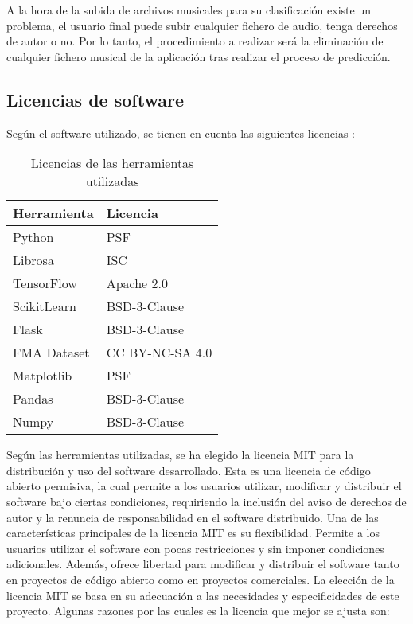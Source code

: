 A la hora de la subida de archivos musicales para su clasificación existe un problema, el usuario final puede subir cualquier fichero de audio, tenga derechos de autor o no. Por lo tanto, el procedimiento a realizar será la eliminación de cualquier fichero musical de la aplicación tras realizar el proceso de predicción.

\subsection{Licencias de software}

Según el software utilizado, se tienen en cuenta las siguientes licencias \cite{Creative_Commons, Open_Source_Initiative_2023}:

\begin{table}[h]
\centering
\caption{Licencias de las herramientas utilizadas}
\begin{tabular}{|l|l|}
\hline
\textbf{Herramienta} & \textbf{Licencia} \\
\hline
Python \cite{3.10_Documentation} & PSF \\
Librosa \cite{librosa} & ISC \\
TensorFlow \cite{TensorFlow} & Apache 2.0 \\
ScikitLearn \cite{scikit} & BSD-3-Clause \\
Flask \cite{Flask} & BSD-3-Clause \\
FMA Dataset \cite{fma_dataset} & CC BY-NC-SA 4.0 \\
Matplotlib \cite{matplotlib} & PSF \\
Pandas \cite{pandas} & BSD-3-Clause \\
Numpy \cite{NumPy} & BSD-3-Clause \\
\hline
\end{tabular}
\end{table}

Según las herramientas utilizadas, se ha elegido la licencia MIT para la distribución y uso del software desarrollado. Esta es una licencia de código abierto permisiva, la cual permite a los usuarios utilizar, modificar y distribuir el software bajo ciertas condiciones, requiriendo la inclusión del aviso de derechos de autor y la renuncia de responsabilidad en el software distribuido.
Una de las características principales de la licencia MIT es su flexibilidad. Permite a los usuarios utilizar el software con pocas restricciones y sin imponer condiciones adicionales. Además, ofrece libertad para modificar y distribuir el software tanto en proyectos de código abierto como en proyectos comerciales.
La elección de la licencia MIT se basa en su adecuación a las necesidades y especificidades de este proyecto. Algunas razones por las cuales es la licencia que mejor se ajusta son:

